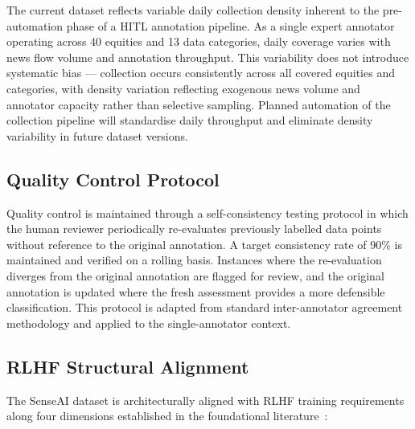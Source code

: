 \documentclass[11pt,a4paper]{article}
\begin{document}
The current dataset reflects variable daily collection density inherent to the
pre-automation phase of a HITL annotation pipeline. As a single expert annotator
operating across 40 equities and 13 data categories, daily coverage varies with news
flow volume and annotation throughput. This variability does not introduce systematic
bias --- collection occurs consistently across all covered equities and categories, with
density variation reflecting exogenous news volume and annotator capacity rather than
selective sampling. Planned automation of the collection pipeline will standardise
daily throughput and eliminate density variability in future dataset versions.

\subsection{Quality Control Protocol}

Quality control is maintained through a self-consistency testing protocol in which the
human reviewer periodically re-evaluates previously labelled data points without
reference to the original annotation. A target consistency rate of 90\% is maintained
and verified on a rolling basis. Instances where the re-evaluation diverges from the
original annotation are flagged for review, and the original annotation is updated
where the fresh assessment provides a more defensible classification. This protocol
is adapted from standard inter-annotator agreement methodology and applied to the
single-annotator context.

\subsection{RLHF Structural Alignment}

The SenseAI dataset is architecturally aligned with RLHF training requirements along
four dimensions established in the foundational
literature~\cite{christiano2017deep,ouyang2022training}:
\end{document}
